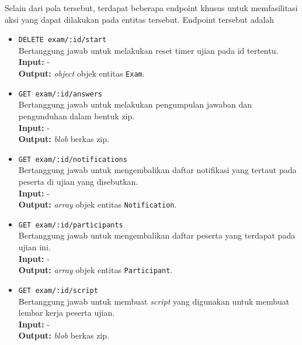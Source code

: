     Selain dari pola tersebut, terdapat beberapa endpoint khusus untuk
    memfasilitasi aksi yang dapat dilakukan pada entitas tersebut. Endpoint
    tersebut adalah
    \begin{itemize}
        \item \texttt{DELETE exam/:id/start} \\
            Bertanggung jawab untuk melakukan reset timer ujian pada id
            tertentu.\\
            \textbf{Input:} -\\
            \textbf{Output:} \textit{object} objek entitas \texttt{Exam}.
            
        \item \texttt{GET exam/:id/answers} \\
            Bertanggung jawab untuk melakukan pengumpulan jawaban dan
            pengunduhan dalam bentuk zip.\\
            \textbf{Input:} -\\
            \textbf{Output:} \textit{blob} berkas zip.
            
        \item \texttt{GET exam/:id/notifications} \\
            Bertanggung jawab untuk mengembalikan daftar notifikasi yang tertaut
            pada peserta di ujian yang disebutkan.\\
            \textbf{Input:} -\\
            \textbf{Output:} \textit{array} objek entitas \texttt{Notification}.
            
        \item \texttt{GET exam/:id/participants} \\
            Bertanggung jawab untuk mengembalikan daftar peserta yang terdapat
            pada ujian ini.\\
            \textbf{Input:} -\\
            \textbf{Output:} \textit{array} objek entitas \texttt{Participant}.
            
        \item \texttt{GET exam/:id/script} \\
            Bertanggung jawab untuk membuat \textit{script} yang digunakan untuk
            membuat lembar kerja peserta ujian.\\
            \textbf{Input:} -\\
            \textbf{Output:} \textit{blob} berkas zip.
            

\end{itemize}
